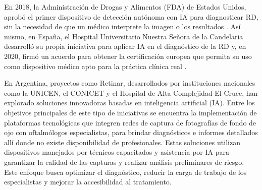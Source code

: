 En 2018, la Administración de Drogas y Alimentos (FDA) de Estados Unidos, aprobó el primer dispositivo de detección autónoma con IA para diagnosticar RD, sin la necesidad de que un médico interprete la imagen o los resultados \parencites{abramoff2018}. Así mismo, en España, el Hospital Universitario Nuestra Señora de la Candelaria desarrolló su propia iniciativa para aplicar IA en el diagnóstico de la RD y, en 2020, firmó un acuerdo para obtener la certificación europea que permita su uso como dispositivo médico apto para la práctica clínica real \parencites{retina2020}.

En Argentina, proyectos como Retinar, desarrollados por instituciones nacionales como la UNICEN, el CONICET y el Hospital de Alta Complejidad El Cruce, han explorado soluciones innovadoras basadas en inteligencia artificial (IA). Entre los objetivos principales de este tipo de iniciativas se encuentra la implementación de plataformas tecnológicas que integren redes de captura de fotografías de fondo de ojo con oftalmólogos especialistas, para brindar diagnósticos e informes detallados allí donde no existe disponibilidad de profesionales. Estas soluciones utilizan dispositivos manejados por técnicos capacitados y asistencia por IA para garantizar la calidad de las capturas y realizar análisis preliminares de riesgo. Este enfoque busca optimizar el diagnóstico, reducir la carga de trabajo de los especialistas y mejorar la accesibilidad al tratamiento.
